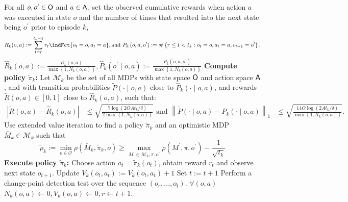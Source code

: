 \documentclass{article} %
\begin{document}
\begin{algorithm}[H]
\begin{algorithmic}[1]
        \STATE \Space For all $o, o^{\prime} \in {\mathsf{O}}$ and $a \in {\mathsf{A}}$, set the observed cumulative rewards when action $a$ was executed in state $o$ and the number of times that resulted into the next state being $o^{\prime}$ prior to episode $k$,
$$
\begin{gathered}
R_k(o, a):=\sum_{t=r}^{t_k-1} r_t \indFct{o_t=o, a_t=a }, \text{and} \ P_k\left(o, a, o^{\prime}\right):=\#\left\{r \leq t <t_k: o_t = o, a_t = a, o_{t+1}=o^{\prime}\right\} .
\end{gathered}
$$
\STATE \Space {} $\hat{R}_k(o, a):=\frac{R_k(o, a)}{\max \left\{1, N_k(o, a)\right\}}, \hat{P}_k\left(o^{\prime} \mid o, a\right):=\frac{P_k\left(o, a, o^{\prime}\right)}{\max \left\{1, N_k(o, a)\right\}}$
\STATE \textbf{Compute policy $\tilde{\pi}_k$:}
\STATE \Space Let $\mathcal{M}_k$ be the set of all MDPs with state space ${\mathsf{O}}$ and action space ${\mathsf{A}}$, and with transition probabilities $\tilde{P}(\cdot \mid o, a)$ close to $\hat{P}_k(\cdot \mid o, a)$, and rewards $\tilde{R}(o, a) \in[0,1]$ close to $\hat{R}_k(o, a)$, such that:
$$
\begin{aligned}
\left|\tilde{R}(o, a)-\hat{R}_k(o, a)\right| & \leq \sqrt{\frac{7 \log \left(2 O A t_k / \delta\right)}{2 \max \left\{1, N_k(o, a)\right\}}} \text { and } \left\|\tilde{P}(\cdot \mid o, a)-\hat{P}_k(\cdot \mid o, a)\right\|_1 & \leq \sqrt{\frac{14 O \log \left(2 A t_k / \delta\right)}{\max \left\{1, N_k(o, a)\right\}}} .
\end{aligned}
$$
\STATE \Space Use extended value iteration to find a policy $\tilde{\pi}_k$ and an optimistic MDP $\bar{M}_k \in \mathcal{M}_k$ such that
$$
\tilde{\rho}_k:=\min_{o \in \mathcal{O}} \rho\left(\bar{M}_k, \tilde{\pi}_k, o\right) \geq \max _{M^{\prime} \in \mathcal{M}_k, \pi, o^{\prime}} \rho\left(M^{\prime}, \pi, o^{\prime}\right)-\frac{1}{\sqrt{t_k}}
$$
\STATE \textbf{Execute policy $\tilde{\pi}_k$:}
\Space {}
\STATE Choose action $a_t=\tilde{\pi}_k\left(o_t\right)$, obtain reward $r_t$ and observe next state $o_{t+1}$. 
\STATE Update $V_k\left(o_t, a_t\right):=V_k\left(o_t, a_t\right)+1$
\STATE Set $t:=t+1$
\STATE Perform a change-point detection test over the sequence $\left( o_r,...,o_t \right)$.   
        \STATE $\forall (o,a)$ $N_{k}(o, a) \leftarrow 0, V_{k}(o, a) \leftarrow 0, r \leftarrow t+1$.
        \ENDIF
\ENDWHILE
	\ENDFOR
	\end{algorithmic}
\end{algorithm}
\end{document}
